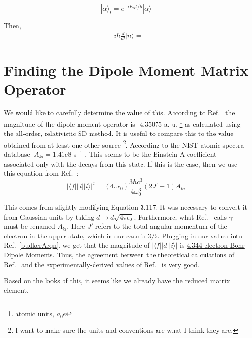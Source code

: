 \begin{equation}
|\alpha\rangle_I=e^{-iE_\alpha t/h}|\alpha\rangle
\end{equation}

Then, 
\begin{align}
-i\hbar \frac{d}{dt}|n\rangle = 
\end{align}

\section{Finding the Dipole Moment Matrix Operator}
We would like to carefully determine the value of this. According to Ref.\ \cite{safronova2photon} the magnitude of the dipole moment operator is -4.35075 a. u. \footnote{atomic units, $a_0 e$} as calculated using the all-order, relativistic SD method. It is useful to compare this to the value obtained from at least one other source \footnote{I want to make sure the units and conventions are what I think they are.}. According to the NIST atomic spectra database, $A_{ki}=1.41e8$ s$^{-1}$ \cite{NISTasd}. This seems to be the Einstein A coefficient associated only with the decays from this state. If this is the case, then we use this equation from Ref.\ \cite{demilleBudkerKimball}:  
\begin{equation}
|\langle f ||d|| i \rangle|^2 = (4 \pi \epsilon_0) \frac{3 \hbar c^3}{4 \omega_0^3} (2 J'+1) A_{ki}\label{budkerAeqn} 
\end{equation}

This comes from slightly modifying Equation 3.117. It was necessary to convert it from Gaussian units by taking $d\rightarrow d \sqrt{4 \pi \epsilon_0}$. Furthermore, what Ref.\ \cite{demilleBudkerKimball} calls $\gamma$ must be renamed $A_{ki}$. Here $J'$ refers to the total angular momentum of the electron in the upper state, which in our case is $3/2$. Plugging in our values into Ref.\ \ref{budkerAeqn}, we get that the magnitude of $|\langle f ||d|| i \rangle|$ is \href{http://www.wolframalpha.com/input/?i=sqrt%283*hbar*c%5E3%2F%284*%282*pi*c%2F407.771+nm%29%5E3%29*4*pi*epsilon_0*4*1.41e8*1%2Fs%29}{4.344 electron Bohr Dipole Moments}.
Thus, the agreement between the theoretical calculations of Ref.\ \cite{safronova2photon} and the experimentally-derived values of Ref.\ \cite{NISTasd} is very good.  

Based on the looks of this, it seems like we already have the reduced matrix element. 


